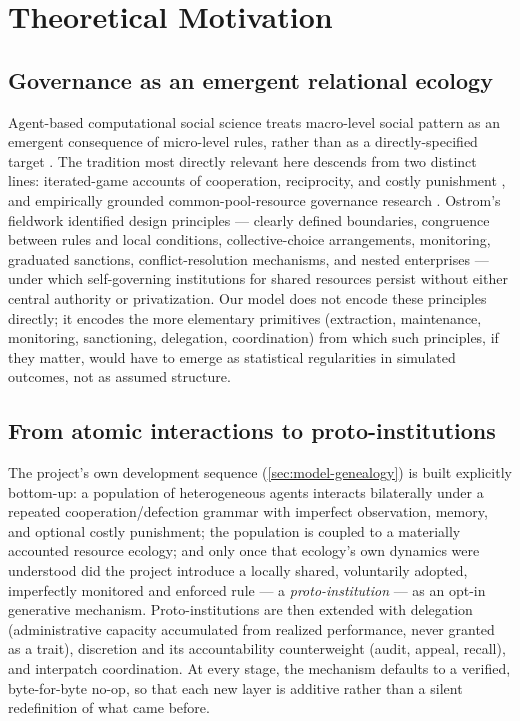 \section{Theoretical Motivation}
\label{sec:theoretical-motivation}

\subsection{Governance as an emergent relational ecology}
\label{sec:emergent-ecology}

Agent-based computational social science treats macro-level social pattern
as an emergent consequence of micro-level rules, rather than as a
directly-specified target
\parencite{epstein1996growing,railsback2019agent}. The tradition most
directly relevant here descends from two distinct lines: iterated-game
accounts of cooperation, reciprocity, and costly punishment
\parencite{axelrod1984evolution,axelrod1981evolution,fehr2002altruistic},
and empirically grounded common-pool-resource governance research
\parencite{ostrom1990governing,janssen2006empirically,poteete2010working}.
Ostrom's fieldwork identified design principles --- clearly defined
boundaries, congruence between rules and local conditions, collective-choice
arrangements, monitoring, graduated sanctions, conflict-resolution
mechanisms, and nested enterprises --- under which self-governing
institutions for shared resources persist without either central
authority or privatization. Our model does not encode these principles
directly; it encodes the more elementary primitives (extraction,
maintenance, monitoring, sanctioning, delegation, coordination) from which
such principles, if they matter, would have to emerge as statistical
regularities in simulated outcomes, not as assumed structure.

\subsection{From atomic interactions to proto-institutions}
\label{sec:atomic-to-proto}

The project's own development sequence (\cref{sec:model-genealogy}) is
built explicitly bottom-up: a population of heterogeneous agents interacts
bilaterally under a repeated cooperation/defection grammar with imperfect
observation, memory, and optional costly punishment; the population is
coupled to a materially accounted resource ecology; and only once that
ecology's own dynamics were understood did the project introduce a
locally shared, voluntarily adopted, imperfectly monitored and enforced
rule --- a \textit{proto-institution} --- as an opt-in generative
mechanism. Proto-institutions are then extended with delegation
(administrative capacity accumulated from realized performance, never
granted as a trait), discretion and its accountability counterweight
(audit, appeal, recall), and interpatch coordination. At every stage, the
mechanism defaults to a verified, byte-for-byte no-op, so that each new
layer is additive rather than a silent redefinition of what came before.


